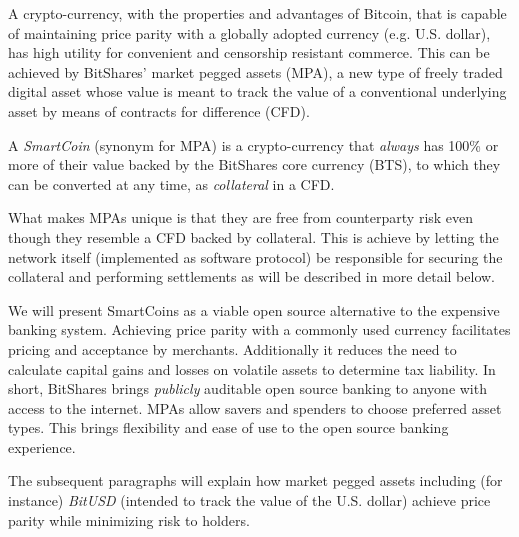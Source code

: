 \label{sec:mpa}

A crypto-currency, with the properties and advantages of Bitcoin, that is
capable of maintaining price parity with a globally adopted currency (e.g.
U.S. dollar), has high utility for convenient and censorship resistant
commerce. This can be achieved by BitShares' market pegged assets (MPA), a new
type of freely traded digital asset whose value is meant to track the value of
a conventional underlying asset by means of contracts for difference (CFD). 

A \emph{SmartCoin} (synonym for MPA) is a crypto-currency that \emph{always}
has 100\% or more of their value backed by the BitShares core currency (BTS),
to which they can be converted at any time, as \emph{collateral} in a CFD.

What makes MPAs unique is that they are free from counterparty risk even though
they resemble a CFD backed by collateral. This is achieve by letting the
network itself (implemented as software protocol) be responsible for securing
the collateral and performing settlements as will be described in more detail
below.



We will present SmartCoins as a viable open source alternative to the expensive
banking system. Achieving price parity with a commonly used currency
facilitates pricing and acceptance by merchants. Additionally it reduces the
need to calculate capital gains and losses on volatile assets to determine tax
liability. In short, BitShares brings \emph{publicly} auditable open source
banking to anyone with access to the internet. MPAs allow savers and spenders
to choose preferred asset types. This brings flexibility and ease of use to the
open source banking experience.
 
The subsequent paragraphs will explain how market pegged assets including (for
instance) \emph{BitUSD} (intended to track the value of the U.S. dollar)
achieve price parity while minimizing risk to holders.
